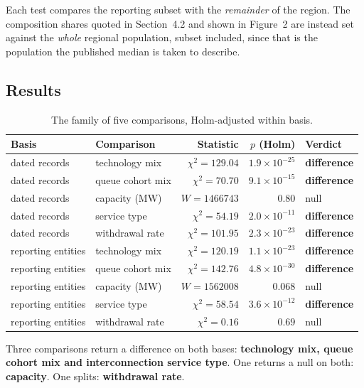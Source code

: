 \documentclass[11pt,a4paper]{article}
\begin{document}
Each test compares the reporting subset with the \emph{remainder} of the region.
The composition shares quoted in Section~4.2 and shown in Figure~2 are instead
set against the \emph{whole} regional population, subset included, since that is
the population the published median is taken to describe.

\subsection{Results}

\begin{table}[htbp]
\centering
\caption{The family of five comparisons, Holm-adjusted within basis.}
\begin{tabular}{llrrl}
\toprule
Basis & Comparison & Statistic & $p$ (Holm) & Verdict \\
\midrule
dated records & technology mix   & $\chi^2 = 129.04$ & $1.9\times10^{-25}$ & \textbf{difference} \\
dated records & queue cohort mix & $\chi^2 = 70.70$  & $9.1\times10^{-15}$ & \textbf{difference} \\
dated records & capacity (MW)    & $W = \num{1466743}$ & $0.80$ & null \\
dated records & service type     & $\chi^2 = 54.19$  & $2.0\times10^{-11}$ & \textbf{difference} \\
dated records & withdrawal rate  & $\chi^2 = 101.95$ & $2.3\times10^{-23}$ & \textbf{difference} \\
\midrule
reporting entities & technology mix   & $\chi^2 = 120.19$ & $1.1\times10^{-23}$ & \textbf{difference} \\
reporting entities & queue cohort mix & $\chi^2 = 142.76$ & $4.8\times10^{-30}$ & \textbf{difference} \\
reporting entities & capacity (MW)    & $W = \num{1562008}$ & $0.068$ & null \\
reporting entities & service type     & $\chi^2 = 58.54$  & $3.6\times10^{-12}$ & \textbf{difference} \\
reporting entities & withdrawal rate  & $\chi^2 = 0.16$   & $0.69$ & null \\
\bottomrule
\end{tabular}
\end{table}

Three comparisons return a difference on both bases: \textbf{technology mix,
queue cohort mix and interconnection service type}. One returns a null on both:
\textbf{capacity}. One splits: \textbf{withdrawal rate}.
\end{document}
